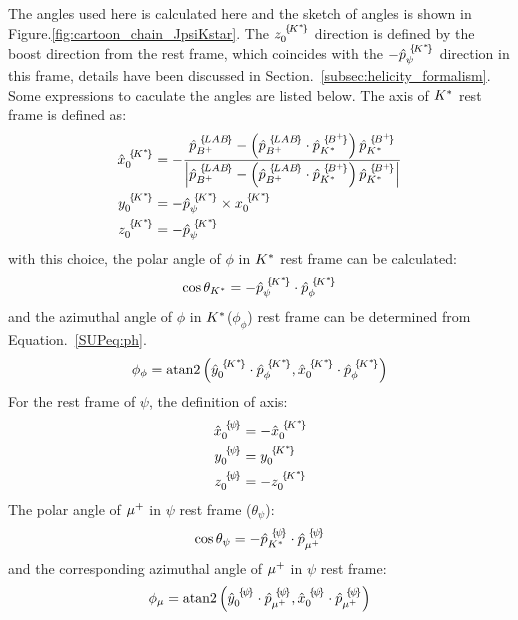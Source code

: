 The angles used here is calculated here and the sketch of angles is shown in Figure.\ref{fig:cartoon_chain_JpsiKstar}.
The ${z}_{{0}}^{\,\,\{\!{{K}^*}\!\}}$ direction is defined by the boost direction from the \Bp rest frame,
which coincides with the $-{\hat{p}}_{{\psi}}^{\,\,\{\!{{K}^*}\!\}}$ direction in this frame,
details have been discussed in Section.~\ref{subsec:helicity_formalism}.
Some expressions to caculate the angles are listed below. 
The axis of ${{K}^*}$ rest frame is defined as: 
\begin{align}
\BA{\hat{x}}{0}{\Kstar} & = - \frac{\BA{\hat{p}}{\Bp}{LAB} - \left(\BA{\hat{p}}{\Bp}{LAB} \cdot \BA{\hat{p}}{\Kstar}{\Bp} \right) \BA{\hat{p}}{\Kstar}{\Bp} }  
{\left|\BA{\hat{p}}{\Bp}{LAB} - \left(\BA{\hat{p}}{\Bp}{LAB} \cdot \BA{\hat{p}}{\Kstar}{\Bp} \right) \BA{\hat{p}}{\Kstar}{\Bp}\right|}\\
\BA{y}{0}{\Kstar} &= - \BA{\hat{p}}{\psi}{\Kstar} \times \BA{x}{0}{\Kstar}\\
\BA{z}{0}{\Kstar} & = - \BA{\hat{p}}{\psi}{\Kstar}
\end{align}
with this choice,
the polar angle of $\phi$ in ${{K}^*}$ rest frame can be calculated:
\begin{equation}
\cos \theta_{{{K}^*}} = -{\hat{p}}_{{\psi}}^{\,\,\{\!{{K}^*}\!\}} \cdot {\hat{p}}_{{\phi}}^{\,\,\{\!{{K}^*}\!\}}
\end{equation}
and the azimuthal angle of $\phi$ in ${{K}^*}$($\phi_\phi$) rest frame can be determined from Equation.~\ref{SUPeq:ph}.
\begin{equation}
\phi_{\phi} = \mathrm{atan2}  \left( \BA{\hat{y}}{0}{\Kstar} \cdot \BA{\hat{p}}{\phi}{\Kstar} , \BA{\hat{x}}{0}{\Kstar} \cdot \BA{\hat{p}}{\phi}{\Kstar} \right)
\label{eq:ME_phi_phi}
\end{equation}
For the rest frame of $\psi$, the definition of axis:
\begin{align}
\BA{\hat{x}}{0}{\psi} & = - \BA{\hat{x}}{0}{\Kstar}\\
\BA{y}{0}{\psi} &= \BA{y}{0}{\Kstar}\\
\BA{z}{0}{\psi} & = - \BA{z}{0}{\Kstar}
\end{align}
The polar angle of ${\mu^+}$ in $\psi$ rest frame ($\theta_{\psi}$):
\begin{equation}
\cos \theta_{\psi} = -{\hat{p}}_{{{{K}^*}}}^{\,\,\{\!\psi\!\}} \cdot {\hat{p}}_{{{\mu^+}}}^{\,\,\{\!\psi\!\}}
\end{equation}
and the corresponding azimuthal angle of ${\mu^+}$ in $\psi$ rest frame:
\begin{equation}
\phi_{\mu} = \mathrm{atan2}  \left( \BA{\hat{y}}{0}{\psi} \cdot \BA{\hat{p}}{\mup}{\psi} , \BA{\hat{x}}{0}{\psi} \cdot \BA{\hat{p}}{\mup}{\psi} \right)
\end{equation}
